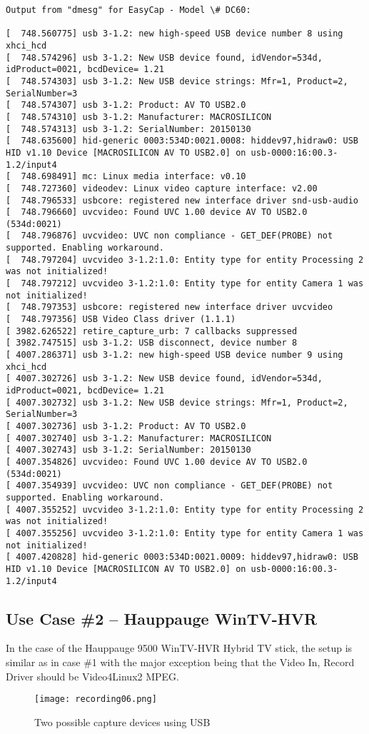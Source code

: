 \begin{lstlisting}[style=sh]
Output from "dmesg" for EasyCap - Model \# DC60:

[  748.560775] usb 3-1.2: new high-speed USB device number 8 using xhci_hcd
[  748.574296] usb 3-1.2: New USB device found, idVendor=534d, idProduct=0021, bcdDevice= 1.21
[  748.574303] usb 3-1.2: New USB device strings: Mfr=1, Product=2, SerialNumber=3
[  748.574307] usb 3-1.2: Product: AV TO USB2.0
[  748.574310] usb 3-1.2: Manufacturer: MACROSILICON
[  748.574313] usb 3-1.2: SerialNumber: 20150130
[  748.635600] hid-generic 0003:534D:0021.0008: hiddev97,hidraw0: USB HID v1.10 Device [MACROSILICON AV TO USB2.0] on usb-0000:16:00.3-1.2/input4
[  748.698491] mc: Linux media interface: v0.10
[  748.727360] videodev: Linux video capture interface: v2.00
[  748.796533] usbcore: registered new interface driver snd-usb-audio
[  748.796660] uvcvideo: Found UVC 1.00 device AV TO USB2.0 (534d:0021)
[  748.796876] uvcvideo: UVC non compliance - GET_DEF(PROBE) not supported. Enabling workaround.
[  748.797204] uvcvideo 3-1.2:1.0: Entity type for entity Processing 2 was not initialized!
[  748.797212] uvcvideo 3-1.2:1.0: Entity type for entity Camera 1 was not initialized!
[  748.797353] usbcore: registered new interface driver uvcvideo
[  748.797356] USB Video Class driver (1.1.1)
[ 3982.626522] retire_capture_urb: 7 callbacks suppressed
[ 3982.747515] usb 3-1.2: USB disconnect, device number 8
[ 4007.286371] usb 3-1.2: new high-speed USB device number 9 using xhci_hcd
[ 4007.302726] usb 3-1.2: New USB device found, idVendor=534d, idProduct=0021, bcdDevice= 1.21
[ 4007.302732] usb 3-1.2: New USB device strings: Mfr=1, Product=2, SerialNumber=3
[ 4007.302736] usb 3-1.2: Product: AV TO USB2.0
[ 4007.302740] usb 3-1.2: Manufacturer: MACROSILICON
[ 4007.302743] usb 3-1.2: SerialNumber: 20150130
[ 4007.354826] uvcvideo: Found UVC 1.00 device AV TO USB2.0 (534d:0021)
[ 4007.354939] uvcvideo: UVC non compliance - GET_DEF(PROBE) not supported. Enabling workaround.
[ 4007.355252] uvcvideo 3-1.2:1.0: Entity type for entity Processing 2 was not initialized!
[ 4007.355256] uvcvideo 3-1.2:1.0: Entity type for entity Camera 1 was not initialized!
[ 4007.420828] hid-generic 0003:534D:0021.0009: hiddev97,hidraw0: USB HID v1.10 Device [MACROSILICON AV TO USB2.0] on usb-0000:16:00.3-1.2/input4
\end{lstlisting}

\subsection{Use Case \#2 – Hauppauge WinTV-HVR}
\label{sub:use_case_wintv}
 
In the case of the Hauppauge 9500 WinTV-HVR Hybrid TV stick, the setup is similar as in case
\#1 with the major exception being that the Video In, Record Driver should be Video4Linux2 MPEG.

\begin{figure}[htpb]
    \centering
    \texttt{[image: recording06.png]}
    \caption{Two possible capture devices using USB}
    \label{fig:recording-usb}
\end{figure}

